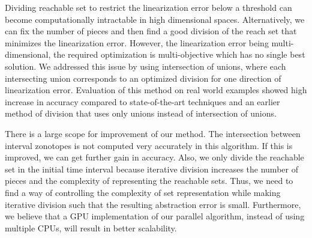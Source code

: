 Dividing reachable set to restrict the linearization error below a
threshold can become computationally intractable in high dimensional
spaces.  Alternatively, we can fix the number of pieces and then find
a good division of the reach set that minimizes the linearization
error.  However, the linearization error being multi-dimensional, the
required optimization is multi-objective which has no single best
solution.  We addressed this issue by using intersection of unions,
where each intersecting union corresponds to an optimized division for
one direction of linearization error.  Evaluation of this method on
real world examples showed high increase in accuracy compared to
state-of-the-art techniques and an earlier method of division that uses only unions instead of intersection of unions.

There is a large scope for improvement of our method.  The
intersection between interval zonotopes is not computed very
accurately in this algorithm.  If this is improved, we can get
further gain in accuracy.  Also, we only divide the
reachable set in the initial time interval because iterative division
increases the number of pieces and the complexity of representing the
reachable sets.  Thus, we need to find a way of controlling the
complexity of set representation while making iterative division such
that the resulting abstraction error is small.  Furthermore, we
believe that a GPU implementation of our parallel algorithm,
instead of using multiple CPUs, will result in better scalability.
